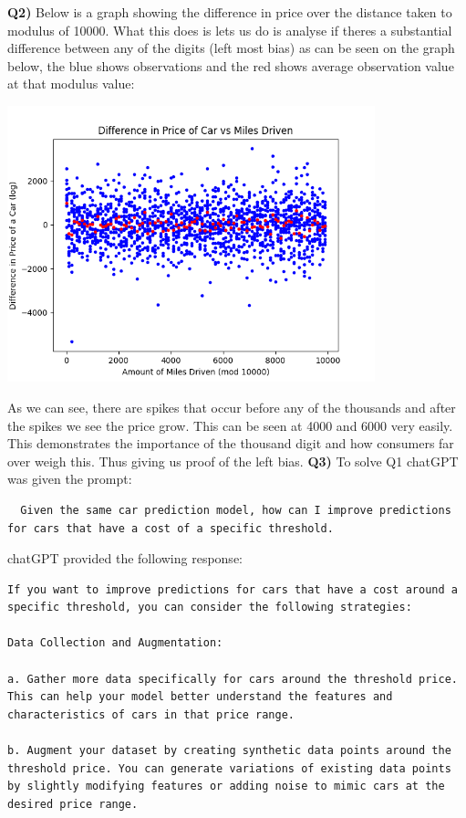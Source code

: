 \documentclass{article}
\begin{document}
\begin{titlepage}
\textbf{Q2)} Below is a graph showing the difference in price over the distance taken to modulus of 10000. What this does is lets us do is analyse if theres a substantial difference between any of the digits (left most bias) as can be seen on the graph below, the blue shows observations and the red shows average observation value at that modulus value:
\begin{center}
\includegraphics[width=0.8\textwidth]{g3.png}
\end{center}
As we can see, there are spikes that occur before any of the thousands and after the spikes we see the price grow. This can be seen at 4000 and 6000 very easily. This demonstrates the importance of the thousand digit and how consumers far over weigh this. Thus giving us proof of the left bias.
\newpage
\textbf{Q3)} To solve Q1 chatGPT was given the prompt: 
\begin{verbatim}
  Given the same car prediction model, how can I improve predictions for cars that have a cost of a specific threshold. 
\end{verbatim}
chatGPT provided the following response:
\begin{verbatim}
If you want to improve predictions for cars that have a cost around a specific threshold, you can consider the following strategies:

Data Collection and Augmentation:

a. Gather more data specifically for cars around the threshold price. This can help your model better understand the features and characteristics of cars in that price range.

b. Augment your dataset by creating synthetic data points around the threshold price. You can generate variations of existing data points by slightly modifying features or adding noise to mimic cars at the desired price range.


\end{verbatim}
\end{titlepage}
\end{document}
